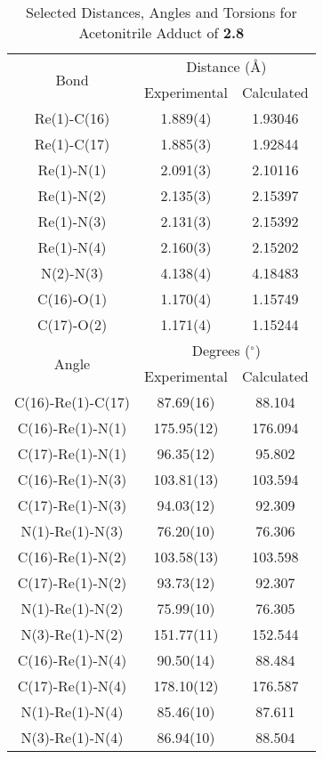 \begin{table}[htbp]
  \centering
  \caption{Selected Distances, Angles and Torsions for Acetonitrile Adduct of \textbf{2.8}}
    \begin{tabular}{ccc}
    \toprule
	\multirow{2}{*}{Bond} & \multicolumn{2}{c}{Distance (\r{A})} \\ \cline{2-3}
     & Experimental & Calculated \\ \midrule
    Re(1)-C(16) & 1.889(4) & 1.93046 \\
    Re(1)-C(17) & 1.885(3) & 1.92844 \\
    Re(1)-N(1) & 2.091(3) & 2.10116 \\
    Re(1)-N(2) & 2.135(3) & 2.15397 \\
    Re(1)-N(3) & 2.131(3) & 2.15392 \\
    Re(1)-N(4) & 2.160(3) & 2.15202 \\ 
    N(2)-N(3) & 4.138(4) & 4.18483 \\ 
    C(16)-O(1) & 1.170(4) & 1.15749 \\
    C(17)-O(2) & 1.171(4) & 1.15244 \\ \midrule
	\multirow{2}{*}{Angle} & \multicolumn{2}{c}{Degrees ($^\circ$)} \\ \cline{2-3}
     & Experimental & Calculated \\ \midrule
    C(16)-Re(1)-C(17) & 87.69(16) & 88.104 \\
    C(16)-Re(1)-N(1) & 175.95(12) & 176.094 \\
    C(17)-Re(1)-N(1) & 96.35(12) & 95.802 \\
    C(16)-Re(1)-N(3) & 103.81(13) & 103.594 \\
    C(17)-Re(1)-N(3) & 94.03(12) & 92.309 \\
    N(1)-Re(1)-N(3) & 76.20(10) & 76.306 \\
    C(16)-Re(1)-N(2) & 103.58(13) & 103.598 \\
    C(17)-Re(1)-N(2) & 93.73(12) & 92.307 \\
    N(1)-Re(1)-N(2) & 75.99(10) & 76.305 \\
    N(3)-Re(1)-N(2) & 151.77(11) & 152.544 \\
    C(16)-Re(1)-N(4) & 90.50(14) & 88.484 \\
    C(17)-Re(1)-N(4) & 178.10(12) & 176.587 \\
    N(1)-Re(1)-N(4) & 85.46(10) & 87.611 \\
    N(3)-Re(1)-N(4) & 86.94(10) & 88.504 \\

\end{tabular}
\end{table}
